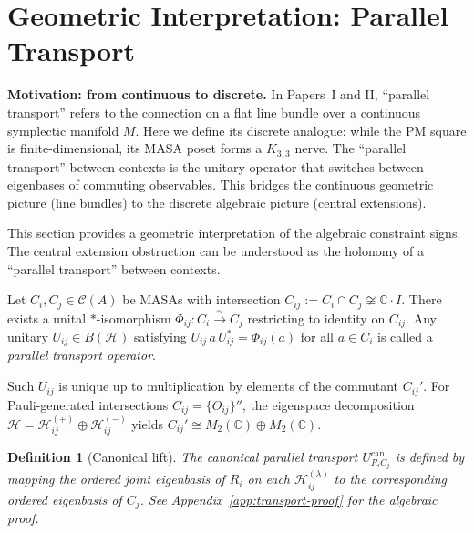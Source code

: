 \documentclass[11pt]{article}
\newtheorem{definition}[theorem]{Definition}
\begin{document}
\section{Geometric Interpretation: Parallel Transport}
\label{sec:transport}

\textbf{Motivation: from continuous to discrete.}
In Papers~I and II, ``parallel transport'' refers to the connection on a
flat line bundle over a continuous symplectic manifold $M$. Here we define
its discrete analogue: while the PM square is finite-dimensional, its MASA
poset forms a $K_{3,3}$ nerve. The ``parallel transport'' between contexts
is the unitary operator that switches between eigenbases of commuting
observables. This bridges the continuous geometric picture (line bundles)
to the discrete algebraic picture (central extensions).

This section provides a geometric interpretation of the algebraic
constraint signs. The central extension obstruction can be understood
as the holonomy of a ``parallel transport'' between contexts.

Let $C_i, C_j \in \mathcal{C}(A)$ be MASAs with intersection
$C_{ij} := C_i \cap C_j \not\cong \mathbb{C}\cdot I$.
There exists a unital $*$-isomorphism
$\Phi_{ij}: C_i \xrightarrow{\;\sim\;} C_j$ restricting to identity on $C_{ij}$.
Any unitary $U_{ij} \in B(\mathcal{H})$ satisfying
$U_{ij}\, a\, U_{ij}^* = \Phi_{ij}(a)$ for all $a \in C_i$
is called a \emph{parallel transport operator}.

Such $U_{ij}$ is unique up to multiplication by elements of the commutant
$C_{ij}'$. For Pauli-generated intersections $C_{ij} = \{O_{ij}\}''$,
the eigenspace decomposition $\mathcal{H} = \mathcal{H}_{ij}^{(+)} \oplus \mathcal{H}_{ij}^{(-)}$
yields $C_{ij}' \cong M_2(\mathbb{C}) \oplus M_2(\mathbb{C})$.

\begin{definition}[Canonical lift]
\label{def:canonical}
The \emph{canonical} parallel transport $U_{R_i C_j}^{\mathrm{can}}$
is defined by mapping the ordered joint eigenbasis of $R_i$ on each
$\mathcal{H}_{ij}^{(\lambda)}$ to the corresponding ordered eigenbasis
of $C_j$. See Appendix~\ref{app:transport-proof} for the algebraic proof.
\end{definition}
\end{document}
